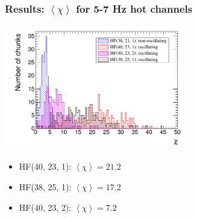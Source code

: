 \documentclass[bigger]{beamer}
\begin{document}
\begin{frame}
\frametitle{Results: $\left<\chi\right>$ for 5-7 Hz hot channels}
\label{sec-3-3-3}
\label{sec-3-3-3-1}

\centering
\includegraphics[width=0.6\textwidth]{fig/amp_over_signif_comparison_more.png}
\begin{itemize}

\item HF(40, 23, 1): $\left<\chi\right> = 21.2$
\label{sec-3-3-3-2}%

\item HF(38, 25, 1): $\left<\chi\right> = 17.2$
\label{sec-3-3-3-3}%

\item HF(40, 23, 2): $\left<\chi\right> = 7.2$
\label{sec-3-3-3-4}%
\end{itemize} %
\end{frame}
\end{document}
